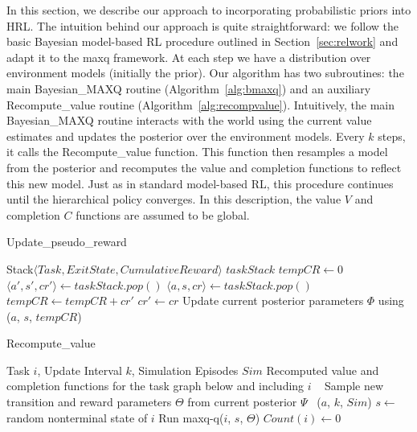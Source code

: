 In this section, we describe our approach to incorporating
probabilistic priors into HRL. The intuition behind our approach is
quite straightforward: we follow the basic Bayesian model-based RL
procedure outlined in Section~\ref{sec:relwork} and adapt it to the
{\sc maxq} framework. At each step we have a distribution over
environment models (initially the prior). Our algorithm has two
subroutines: the main {\sc Bayesian\_MAXQ} routine
(Algorithm~\ref{alg:bmaxq}) and an auxiliary {\sc Recompute\_value}
routine (Algorithm~\ref{alg:recompvalue}). Intuitively, the main {\sc
  Bayesian\_MAXQ} routine interacts with the world using the current
value estimates and updates the posterior over the environment models.
Every $k$ steps, it calls the {\sc Recompute\_value} function. This
function then resamples a model from the posterior and recomputes the
value and completion functions to reflect this new model. Just as in
standard model-based RL, this procedure continues until the
hierarchical policy converges. In this description, the value $V$ and
completion $C$ functions are assumed to be global.

\begin{algorithm}[t]
\caption{{\sc Update\_pseudo\_reward}}
\begin{algorithmic}[1]
\REQUIRE Stack$\langle Task, ExitState, CumulativeReward \rangle$ $taskStack$
\STATE $ tempCR \leftarrow 0$
\STATE $\langle a', s', cr' \rangle \leftarrow taskStack.pop()$
\STATE $\langle a, s, cr \rangle \leftarrow taskStack.pop()$
\STATE $ tempCR \leftarrow tempCR+cr'$
\STATE $cr' \leftarrow cr$
\STATE Update current posterior parameters $\Phi$ using ($a$, $s$, $tempCR$)
\ENDWHILE
\end{algorithmic}
\end{algorithm}

\begin{algorithm}[t]
\caption{{\sc Recompute\_value}} \label{alg:recompvalue}
\begin{algorithmic}[1]
\REQUIRE Task $i$, Update Interval $k$, Simulation Episodes $Sim$
\ENSURE Recomputed value and completion functions for the task graph below and including $i$
\RETURN~\label{line:checkk}
\ENDIF
{}  
\STATE Sample new transition and reward parameters $\Theta$ from
current posterior $\Psi$~\label{line:sample}
\ELSE
{}
($a$, $k$, $Sim$)
\ENDFOR
{}
\STATE $s \leftarrow$ random nonterminal state of $i$
\STATE Run {\sc maxq-q}($i$, $s$, $\Theta$) 
\ENDFOR
\ENDIF
\STATE $Count(i) \leftarrow 0$
\end{algorithmic}
\end{algorithm} 


